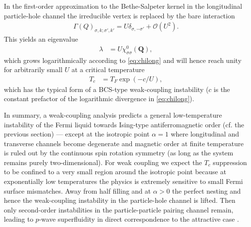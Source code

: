 \documentclass[twocolumn,superscriptaddress,pra,showpacs,longbibliography]{revtex4-1}
\newcommand{\<}{\langle}
\renewcommand{\>}{\rangle}
\begin{document}
In the first-order approximation to the Bethe-Salpeter kernel in the longitudinal particle-hole channel the irreducible vertex is replaced by the bare interaction
\begin{align}
\Gamma(Q)_{\sigma,k;\sigma',k'} = U \delta_{\sigma, -\sigma'} + \mathcal{O}(U^2) .
\end{align}
This yields an eigenvalue
\begin{align}
\lambda &= U \chi^{0}_{\sigma \sigma}(\pmb{Q}),
\end{align}
which grows logarithmically according to \eqref{eq:chilong} and will hence reach unity for arbitrarily small $U$ at a critical temperature 
\begin{align}
T_c &= T_F \exp(-c/U),
\label{eq:Tc}
\end{align}
which has the typical form of a BCS-type weak-coupling instability ($c$ is the constant prefactor of the logarithmic divergence in \eqref{eq:chilong}).

In summary, a weak-coupling analysis predicts a general low-temperature instability of the Fermi liquid towards Ising-type antiferromagnetic order (cf. the previous section) --- except at the isotropic point $\alpha=1$ where longitudinal and transverse channels become degenerate and magnetic order at finite temperature is ruled out by the continuous spin rotation symmetry (as long as the system remains purely two-dimensional).
For weak coupling we expect the $T_c$ suppression to be confined to a very small region around the isotropic point because at exponentially low temperatures the physics is extremely sensitive to small Fermi surface mismatches.
Away from half filling and at $\alpha > 0$ the perfect nesting and hence the weak-coupling instability in the particle-hole channel is lifted. Then only second-order instabilities in the particle-particle pairing channel remain, leading to $p$-wave superfluidity in direct correspondence to the attractive case \cite{Gukelberger:2014dba}.
\end{document}
